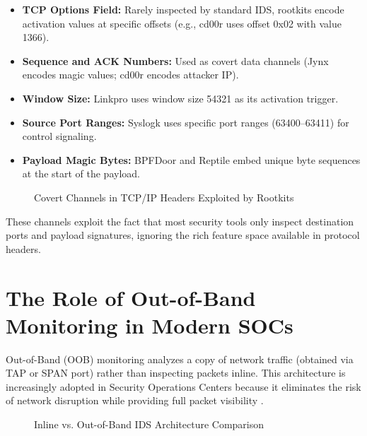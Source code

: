 \begin{itemize}
    \item \textbf{TCP Options Field:} Rarely inspected by standard IDS, rootkits encode activation values at specific offsets (e.g., cd00r uses offset 0x02 with value 1366).
    \item \textbf{Sequence and ACK Numbers:} Used as covert data channels (Jynx encodes magic values; cd00r encodes attacker IP).
    \item \textbf{Window Size:} Linkpro uses window size 54321 as its activation trigger.
    \item \textbf{Source Port Ranges:} Syslogk uses specific port ranges (63400--63411) for control signaling.
    \item \textbf{Payload Magic Bytes:} BPFDoor and Reptile embed unique byte sequences at the start of the payload.
\end{itemize}

\begin{figure}[h]
\centering
{}
\caption{Covert Channels in TCP/IP Headers Exploited by Rootkits}
\label{fig:tcp_covert_channels}
\end{figure}

These channels exploit the fact that most security tools only inspect destination ports and payload signatures, ignoring the rich feature space available in protocol headers.

\section{The Role of Out-of-Band Monitoring in Modern SOCs}

Out-of-Band (OOB) monitoring analyzes a copy of network traffic (obtained via TAP or SPAN port) rather than inspecting packets inline. This architecture is increasingly adopted in Security Operations Centers because it eliminates the risk of network disruption while providing full packet visibility \cite{paxson1999bro}.

\begin{figure}[h]
\centering
{}
\caption{Inline vs. Out-of-Band IDS Architecture Comparison}
\label{fig:inline_vs_oob}
\end{figure}

